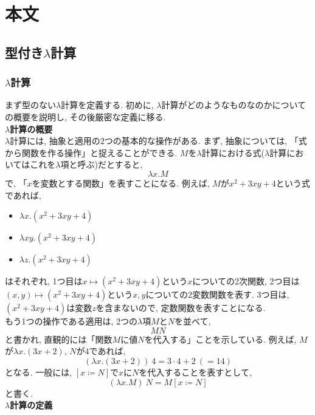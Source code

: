 \documentclass[11pt]{jarticle}
\theoremstyle{mystyle}
\newcommand{\0}{\textbf{0}}
\newcommand{\1}{\textbf{1}}
\newcommand{\2}{\textbf{2}}
\begin{document}
\section{本文}
\subsection{型付き$\lambda$計算} \label{ssec lambda}
\subsubsection{$\lambda$計算} \label{sssec lambdacal}
まず型のない$\lambda$計算を定義する. 初めに, $\lambda$計算がどのようなものなのかについての概要を説明し, その後厳密な定義に移る. \\
\textbf{$\lambda$計算の概要}\\
$\lambda$計算には, 抽象と適用の2つの基本的な操作がある. まず, 抽象については, 「式から関数を作る操作」と捉えることができる. $M$を$\lambda$計算における式($\lambda$計算においてはこれを$\lambda$項と呼ぶ)だとすると, 
\[
  \lambda x . M
\]
で, 「$x$を変数とする関数」を表すことになる. 
例えば, $M$が$x^2 + 3xy + 4$という式であれば, 
\begin{itemize}
  \item $\lambda x . (x^2 + 3xy + 4)$
  \item $\lambda xy . (x^2 + 3xy + 4)$
  \item $\lambda z . (x^2 + 3xy + 4)$
\end{itemize}
はそれぞれ, 1つ目は$x \mapsto (x^2 + 3xy + 4)$という$x$についての2次関数, 
2つ目は$(x, y) \mapsto (x^2 + 3xy + 4)$という$x, y$についての2変数関数を表す. 
3つ目は, $(x^2 + 3xy + 4)$は変数$z$を含まないので, 定数関数を表すことになる. \\
もう1つの操作である適用は, 2つの$\lambda$項$M$と$N$を並べて, 
\[
  MN
\]
と書かれ, 直観的には「関数$M$に値$N$を代入する」ことを示している. 
例えば, $M$が$\lambda x . (3x + 2)$, $N$が$4$であれば, 
\[
  (\lambda x . (3x + 2))\ 4 = 3 \cdot 4 + 2\ (= 14)
\]
となる. 一般には, $[x \coloneqq N]$で$x$に$N$を代入することを表すとして, 
\[
  (\lambda x. M)\ N = M[x\coloneqq N]
\]
と書く. \\
\textbf{{$\lambda$計算の定義}}
\end{document}
